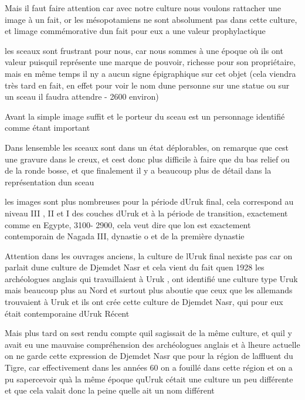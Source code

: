 \documentclass{article}
\begin{document}
Mais il faut faire attention car avec notre culture nous voulons
rattacher une image à un fait, or les mésopotamiens ne sont absolument
pas dans cette culture, et l{\textquotesingle}image commémorative
d{\textquotesingle}un fait pour eux a une valeur prophylactique

les sceaux sont frustrant pour nous, car nous sommes à une époque où ils
ont valeur puisqu{\textquotesingle}il représente une marque de pouvoir,
richesse pour son propriétaire, mais en même temps il
n{\textquotesingle}y a aucun signe épigraphique sur cet objet (cela
viendra très tard en fait, en effet pour voir le nom
d{\textquotesingle}une personne sur une statue ou sur un sceau il
faudra attendre - 2600 environ)

Avant la simple image suffit et le porteur du sceau est un personnage
identifié comme étant important

Dans l{\textquotesingle}ensemble les sceaux sont dans un état
déplorables, on remarque que c{\textquotesingle}est une gravure dans le
creux, et c{\textquotesingle}est donc plus difficile à faire que du bas
relief ou de la ronde bosse, et que finalement il y a beaucoup plus de
détail dans la représentation d{\textquotesingle}un sceau

les images sont plus nombreuses pour la période d{\textquotesingle}Uruk
final, cela correspond au niveau III , II et I des couches
d{\textquotesingle}Uruk et à la période de transition, exactement comme
en Egypte, 3100- 2900, cela veut dire que l{\textquotesingle}on est
exactement contemporain de Nagada III, dynastie o et de la première
dynastie

Attention dans les ouvrages anciens, la culture de
l{\textquotesingle}Uruk final n{\textquotesingle}existe pas car on
parlait d{\textquotesingle}une culture de Djemdet Nasr et cela vient du
fait qu{\textquotesingle}en 1928 les archéologues anglais qui
travaillaient à Uruk , ont identifié une culture type Uruk mais
beaucoup plus au Nord et surtout plus aboutie que ceux que les
allemands trouvaient à Uruk et ils ont crée cette culture de Djemdet
Nasr, qui pour eux était contemporaine d{\textquotesingle}Uruk Récent

Mais plus tard on s{\textquotesingle}est rendu compte
qu{\textquotesingle}il s{\textquotesingle}agissait de la même culture,
et qu{\textquotesingle}il y avait eu une mauvaise compréhension des
archéologues anglais et à l{\textquotesingle}heure actuelle on ne garde
cette expression de Djemdet Nasr que pour la région de
l{\textquotesingle}affluent du Tigre, car effectivement dans les années
60  on a fouillé dans cette région et on a pu
s{\textquotesingle}apercevoir qu{\textquotesingle}à la même époque
qu{\textquotesingle}Uruk c{\textquotesingle}était une culture un peu
différente et que cela valait donc la peine qu{\textquotesingle}elle
ait un nom différent
\end{document}
